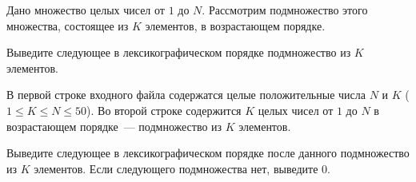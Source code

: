 

Дано множество целых чисел от $1$ до $N$. Рассмотрим подмножество этого множества, состоящее из $K$ элементов, в возрастающем порядке.

Выведите следующее в лексикографическом порядке подмножество из $K$ элементов.

\InputFile
В первой строке входного файла содержатся целые положительные числа $N$ и $K$ ($1 \leqslant K \leqslant N \leqslant 50$). Во второй строке содержится $K$ целых чисел от $1$ до $N$ в возрастающем порядке~--- подмножество из $K$ элементов.

\OutputFile
Выведите следующее в лексикографическом порядке после данного подмножество из $K$ элементов.
Если следующего подмножества нет, выведите $0$.

